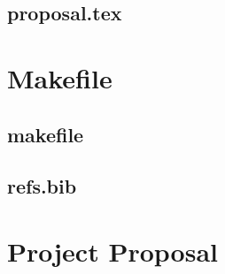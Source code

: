 \documentclass[12pt,a4paper,twoside,openright]{report}
\begin{document}
\section{proposal.tex}
{\scriptsize}

\chapter{Makefile}

\section{makefile}\label{makefile}
{\scriptsize}

\section{refs.bib}
{\scriptsize}


\chapter{Project Proposal}


\end{document}
